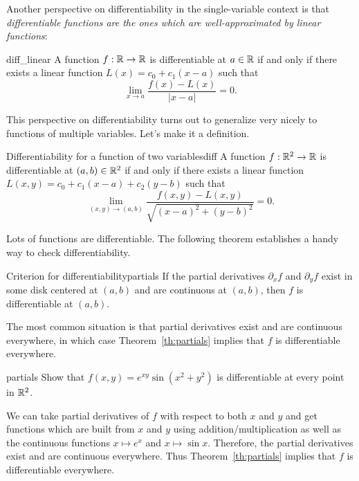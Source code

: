\documentclass[svgnames]{report}
\begin{document}
  Another perspective on differentiability in the single-variable
  context is that \textit{differentiable functions are the ones which
    are well-approximated by linear functions}:

  \begin{theo}{}{diff_linear}
    A function $f: \mathbb{R} \to \mathbb{R}$ is differentiable at $a \in \mathbb{R}$ if and
    only if there exists a linear function $L(x) = c_0 + c_1(x-a) $
    such that
    \[
      \lim_{x \to a}\frac{f(x) - L(x)}{|x-a|} = 0. 
    \]
  \end{theo}

  This perspective on differentiability turns out to generalize very
  nicely to functions of multiple variables. Let's make it a
  definition.

  \begin{defn}{Differentiability for a function of two variables}{diff}
    A function $f: \mathbb{R}^2 \to \mathbb{R}$ is differentiable at $(a,b) \in \mathbb{R}^2$
    if and only if there exists a linear function
    $L(x,y) = c_0 + c_{1}(x-a) + c_{2}(y-b)$ such that
    \[
      \lim_{(x,y) \to (a,b)}\frac{f(x,y) - L(x,y)}{\sqrt{(x-a)^2 + (y-b)^2}} = 0. 
    \]
  \end{defn}

  Lots of functions are differentiable. The following theorem
  establishes a handy way to check differentiability. 

  \begin{theo}{Criterion for differentiability}{partials} 
    If the partial derivatives $\partial_x f$ and $\partial_y f$ exist
    in some disk centered at $(a,b)$ and are continuous at $(a,b)$, then
    $f$ is differentiable at $(a,b)$. 
  \end{theo}

  The most common situation is that partial derivatives exist and are
  continuous everywhere, in which case Theorem~\ref{th:partials}
  implies that $f$ is differentiable everywhere.

  \begin{example}{}{partials}
    Show that $f(x,y) = e^{xy} \sin (x^2 + y^2)$ is differentiable at
    every point in $\mathbb{R}^2$. 
  \end{example}

  \begin{solution}
    We can take partial derivatives of $f$ with respect to both $x$
    and $y$ and get functions which are built from $x$ and $y$ using
    addition/multiplication as well as the continuous functions
    $x\mapsto e^x$ and $x\mapsto \sin x$. Therefore, the partial
    derivatives exist and are continuous everywhere. Thus
    Theorem~\ref{th:partials} implies that $f$ is differentiable
    everywhere. 
  \end{solution}
\end{document}
